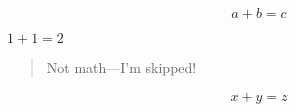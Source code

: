 \begin{equation*}
    a + b = c
\end{equation*}

$ 1 + 1 = 2 $

\begin{quote}
    Not math---I'm skipped!
\end{quote}

\[ x + y = z \]
